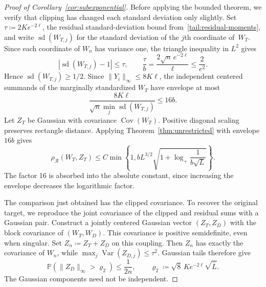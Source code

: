 \documentclass[11pt,letterpaper]{article}
\theoremstyle{remark}
\newcommand{\Pp}{\mathbb P}
\newcommand{\Cov}{\operatorname{Cov}}
\newcommand{\Var}{\operatorname{Var}}
\newcommand{\rh}{\rho_{\mathcal R}}
\begin{document}
\begin{proof}[Proof of Corollary~\ref{cor:subexponential}]
Before applying the bounded theorem, we verify that clipping has
changed each standard deviation only slightly. Set
\(\tau\coloneqq 2Ke^{-2\ell}\), the residual standard-deviation
bound from~\eqref{tail:residual-moments}, and write \(\operatorname{sd}(W_{T,j})\) for the
standard deviation of the \(j\)th coordinate of~\(W_T\).
Since each coordinate of \(W_n\) has variance one, the triangle
inequality in \(L^2\) gives
\[
 |\operatorname{sd}(W_{T,j})-1|\le\tau,
 \qquad \frac\tau b=\frac{2\sqrt n\,e^{-2\ell}}\ell
 \le\frac2{e^2}.
\]
Hence \(\operatorname{sd}(W_{T,j})\ge1/2\). Since \(\|Y_i\|_\infty\le8K\ell\), the
independent centered summands of the marginally standardized \(W_T\)
have envelope at most
\[
 \frac{8K\ell}{\sqrt n\min_j\operatorname{sd}(W_{T,j})}\le16b.
\]
Let \(Z_T\) be Gaussian with covariance \(\Cov(W_T)\).
Positive diagonal scaling preserves rectangle distance. Applying
Theorem~\ref{thm:unrestricted} with envelope \(16b\) gives
\begin{equation}
 \rh(W_T,Z_T)\le C\min\left\{1,
 bL^{3/2}\sqrt{1+\log_+\frac1{b\sqrt L}}\right\}.
 \label{tail:bounded-comparison}
\end{equation}
The factor 16 is absorbed into the absolute constant, since increasing
the envelope decreases the logarithmic factor.

The comparison just obtained has the clipped covariance. To recover
the original target, we reproduce the joint covariance of the clipped
and residual sums with a Gaussian pair. Construct a jointly centered Gaussian vector \((Z_T,Z_D)\) with the
block covariance of \((W_T,W_D)\). This covariance is positive
semidefinite, even when singular. Set \(Z_n\coloneqq Z_T+Z_D\) on this coupling.
Then \(Z_n\) has exactly the covariance of \(W_n\), while
\(\max_j\Var(Z_{D,j})\le\tau^2\). Gaussian tails therefore give
\begin{equation}
 \Pp(\|Z_D\|_\infty>\varrho_2)\le\frac1{2n},\qquad
 \varrho_2\coloneqq \sqrt8\,Ke^{-2\ell}\sqrt{\bar L}.
 \label{tail:Gaussian-coupling}
\end{equation}
The Gaussian components need not be independent.


\end{proof}
\end{document}
